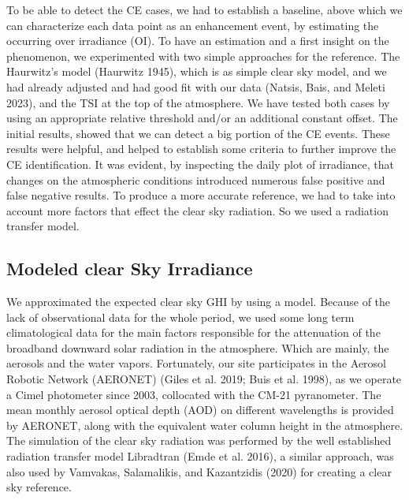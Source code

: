 \documentclass[
]{article}
\begin{document}
To be able to detect the CE cases, we had to establish a baseline, above which we can
characterize each data point as an enhancement event, by estimating the occurring
over irradiance (OI). To have an estimation and a first insight on the phenomenon,
we experimented with two simple approaches for the reference. The Haurwitz's model
(Haurwitz 1945), which is as simple clear sky model, and we had already adjusted and
had good fit with our data (Natsis, Bais, and Meleti 2023), and the TSI at the top of the atmosphere.
We have tested both cases by using an appropriate relative threshold and/or an
additional constant offset. The initial results, showed that we can detect a big
portion of the CE events. These results were helpful, and helped to establish some
criteria to further improve the CE identification. It was evident, by inspecting the
daily plot of irradiance, that changes on the atmospheric conditions introduced
numerous false positive and false negative results. To produce a more accurate
reference, we had to take into account more factors that effect the clear sky
radiation. So we used a radiation transfer model.

\hypertarget{modeled-clear-sky-irradiance}{%
\subsection{Modeled clear Sky Irradiance}\label{modeled-clear-sky-irradiance}}

We approximated the expected clear sky GHI by using a model. Because of the lack of
observational data for the whole period, we used some long term climatological data
for the main factors responsible for the attenuation of the broadband downward solar
radiation in the atmosphere. Which are mainly, the aerosols and the water vapors.
Fortunately, our site participates in the Aerosol Robotic Network (AERONET)
(Giles et al. 2019; Buis et al. 1998), as we operate a Cimel photometer since 2003, collocated with
the CM-21 pyranometer. The mean monthly aerosol optical depth (AOD) on different
wavelengths is provided by AERONET, along with the equivalent water column height in
the atmosphere. The simulation of the clear sky radiation was performed by the well
established radiation transfer model Libradtran (Emde et al. 2016), a similar
approach, was also used by Vamvakas, Salamalikis, and Kazantzidis (2020) for creating a clear sky reference.
\end{document}
